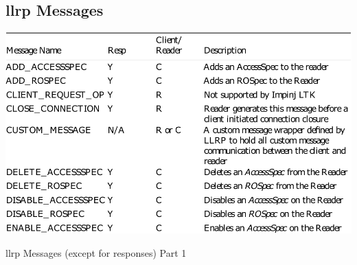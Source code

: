 \begin{appendices}
\clearpage

\section{\ac{llrp} Messages} \label{anx:llrpmessages}
\begin{table}[!ht]
    \centering
    \includegraphics[width=\textwidth]{./figs/02-state-of-the-art/table_llrpmessages_1.pdf}
    \caption[\ac{llrp} Messages (except for responses) Part 1]{\ac{llrp} Messages (except for responses) Part 1~\cite{ImpinjLTKProgrammers}} 
    \label{tab:llrpmessages1}
\end{table}



\end{appendices}
